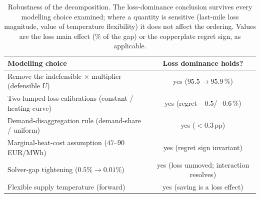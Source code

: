 \begin{table}[t]
\centering
\caption{Robustness of the decomposition. The loss-dominance conclusion survives every modelling
choice examined; where a quantity is sensitive (last-mile loss magnitude, value of temperature
flexibility) it does not affect the ordering. Values are the loss main effect (\% of the gap) or
the copperplate regret sign, as applicable.}
\label{tab:robustness}
\begin{tabular}{lc}
\hline
Modelling choice & Loss dominance holds? \\
\hline
Remove the indefensible $\times$ multiplier (defensible $U$) & yes ($95.5\!\to\!95.9$\,\%) \\
Two lumped-loss calibrations (constant / heating-curve) & yes (regret $-0.5$/$-0.6$\,\%) \\
Demand-disaggregation rule (demand-share / uniform) & yes ($<0.3$\,pp) \\
Marginal-heat-cost assumption ($47$--$90$\,EUR/MWh) & yes (regret sign invariant) \\
Solver-gap tightening ($0.5\% \to 0.01\%$) & yes (loss unmoved; interaction resolves) \\
Flexible supply temperature (forward) & yes (saving is a loss effect) \\
\hline
\end{tabular}
\end{table}
